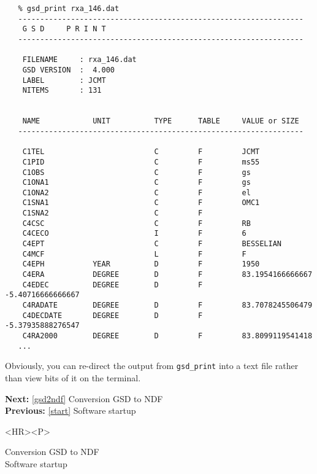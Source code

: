 \begin{verbatim}
   % gsd_print rxa_146.dat
   -----------------------------------------------------------------
    G S D     P R I N T
   -----------------------------------------------------------------

    FILENAME     : rxa_146.dat
    GSD VERSION  :  4.000
    LABEL        : JCMT                                    
    NITEMS       : 131


    NAME            UNIT          TYPE      TABLE     VALUE or SIZE
   -----------------------------------------------------------------

    C1TEL                         C         F         JCMT
    C1PID                         C         F         ms55
    C1OBS                         C         F         gs
    C1ONA1                        C         F         gs
    C1ONA2                        C         F         el
    C1SNA1                        C         F         OMC1
    C1SNA2                        C         F
    C4CSC                         C         F         RB
    C4CECO                        I         F         6
    C4EPT                         C         F         BESSELIAN
    C4MCF                         L         F         F
    C4EPH           YEAR          D         F         1950
    C4ERA           DEGREE        D         F         83.1954166666667
    C4EDEC          DEGREE        D         F         -5.40716666666667
    C4RADATE        DEGREE        D         F         83.7078245506479
    C4DECDATE       DEGREE        D         F         -5.37935888276547
    C4RA2000        DEGREE        D         F         83.8099119541418
   ...
\end{verbatim}

   Obviously, you can re-direct the output from {\tt gsd\_print} into a
   text file rather than view bits of it on the terminal.

\begin{latexonly}
{\bf Next:} \ref{gsd2ndf} Conversion GSD to NDF\\
{\bf Previous:} \ref{start} Software startup\\
\end{latexonly}

\begin{htmlonly}
\begin{rawhtml} <HR><P> \end{rawhtml}
{\bf {}} Conversion GSD to NDF\\
{\bf {}} Software startup\\
{\bf {}}\\
{\bf {}}\\
\end{htmlonly}


